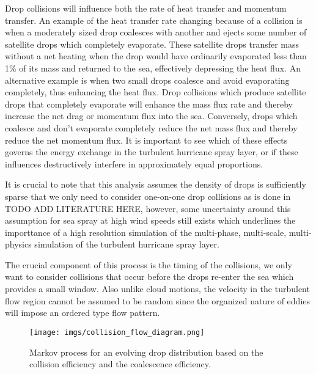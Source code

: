 \documentclass[10pt,a4paper]{article}
\begin{document}
Drop collisions will influence both the rate of heat transfer and momentum transfer. An example of the heat transfer rate changing because of a collision is when a moderately sized drop coalesces with another and ejects some number of satellite drops which completely evaporate. These satellite drops transfer mass without a net heating when the drop would have ordinarily evaporated less than 1\% of its mass and returned to the sea, effectively depressing the heat flux. An alternative example is when two small drops coalesce and avoid evaporating completely, thus enhancing the heat flux. Drop collisions which produce satellite drops that completely evaporate will enhance the mass flux rate and thereby increase the net drag or momentum flux into the sea. Conversely, drops which coalesce and don't evaporate completely reduce the net mass flux and thereby reduce the net momentum flux. It is important to see which of these effects governs the energy exchange in the turbulent hurricane spray layer, or if these influences destructively interfere in approximately equal proportions.

It is crucial to note that this analysis assumes the density of drops is sufficiently sparse that we only need to consider one-on-one drop collisions as is done in TODO ADD LITERATURE HERE, however, some uncertainty around this assumption for sea spray at high wind speeds still exists which underlines the importtance of a high resolution simulation of the multi-phase, multi-scale, multi-physics simulation of the turbulent hurricane spray layer.
%

The crucial component of this process is the timing of the collisions, we only want to consider collisions that occur before the drops re-enter the sea which provides a small window. Also unlike cloud motions, the velocity in the turbulent flow region cannot be assumed to be random since the organized nature of eddies will impose an ordered type flow pattern.
\begin{figure}[ht!]
\centering
\texttt{[image: imgs/collision\_flow\_diagram.png]}
\caption{Markov process for an evolving drop distribution based on the collision efficiency and the coalescence efficiency.}
\end{figure}
\end{document}
